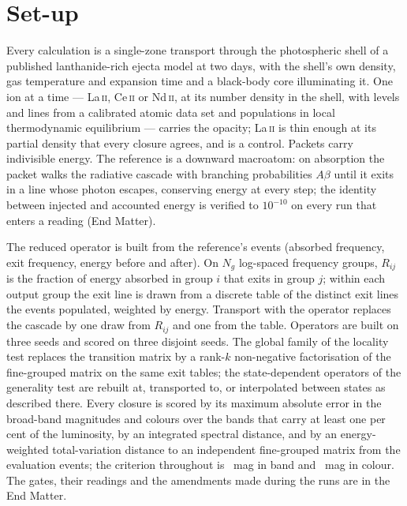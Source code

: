 \documentclass[aps,prl,twocolumn,superscriptaddress,nofootinbib,longbibliography]{revtex4-2}
\begin{document}
\section{Set-up}
\label{sec:method}
Every calculation is a single-zone transport through the photospheric
shell of a published lanthanide-rich ejecta model at two days, with the
shell's own density, gas temperature and expansion time and a black-body
core illuminating it. One ion at a time --- La\,\textsc{ii},
Ce\,\textsc{ii} or Nd\,\textsc{ii}, at its number density in the shell, with
levels and lines from a calibrated atomic data set \citep{gsi_atomic} and
populations in local thermodynamic equilibrium --- carries the opacity;
La\,\textsc{ii} is thin enough at its partial density that every closure
agrees, and is a control. Packets carry indivisible energy. The reference
is a downward macroatom: on absorption the packet walks the radiative
cascade with branching probabilities $A\beta$ until it exits in a line
whose photon escapes, conserving energy at every step; the identity
between injected and accounted energy is verified to $10^{-10}$ on every
run that enters a reading (End Matter).

The reduced operator is built from the reference's events (absorbed
frequency, exit frequency, energy before and after). On $N_g$ log-spaced
frequency groups, $R_{ij}$ is the fraction of energy absorbed in group $i$
that exits in group $j$; within each output group the exit line is drawn
from a discrete table of the distinct exit lines the events populated,
weighted by energy. Transport with the operator replaces the cascade by one
draw from $R_{ij}$ and one from the table. Operators are built on three
seeds and scored on three disjoint seeds. The global family of the
locality test replaces the transition matrix by a rank-$k$
non-negative factorisation of the fine-grouped matrix on the same exit
tables; the state-dependent operators of the generality test are
rebuilt at, transported to, or interpolated between states as described
there. Every closure is scored by its maximum absolute error in the
broad-band magnitudes and colours over the bands that carry at least one
per cent of the luminosity, by an integrated spectral distance, and by an
energy-weighted total-variation distance to an independent fine-grouped
matrix from the evaluation events; the criterion throughout is
\PBdmMax~mag in band and \PBdcolMax~mag in colour. The gates, their
readings and the amendments made during the runs are in the End Matter.
\end{document}
